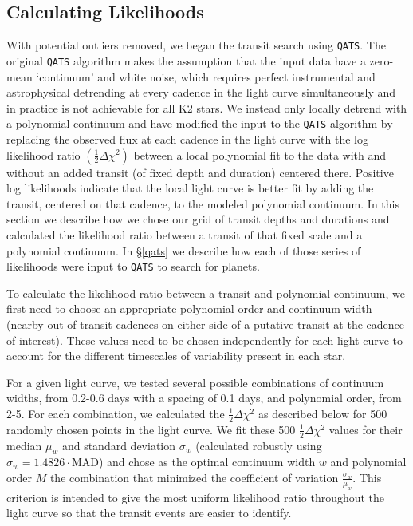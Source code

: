 \documentclass[twocolumn]{aastex62}
\newcommand{\pipeline}[1]{\texttt{#1}}
\begin{document}
\subsection{Calculating Likelihoods}
\label{likelis}

With potential outliers removed, we began the transit search using
\pipeline{QATS}.  The original \pipeline{QATS} algorithm makes the
assumption that the input data have a zero-mean `continuum' and white
noise, which requires perfect instrumental and astrophysical
detrending at every cadence in the light curve simultaneously and in
practice is not achievable for all K2 stars.  We instead only locally
detrend with a polynomial continuum and have modified the input to the
\pipeline{QATS} algorithm by replacing the observed flux at each
cadence in the light curve with the log likelihood ratio
$\left(\frac{1}{2}\Delta \chi^2\right)$ between a local polynomial fit
to the data with and without an added transit (of fixed depth and
duration) centered there. Positive log likelihoods indicate that the
local light curve is better fit by adding the transit, centered on
that cadence, to the modeled polynomial continuum. In this section we
describe how we chose our grid of transit depths and durations and
calculated the likelihood ratio between a transit of that fixed scale
and a polynomial continuum. In \S\ref{qats} we describe how each of
those series of likelihoods were input to \pipeline{QATS} to search
for planets.

To calculate the likelihood ratio between a transit and polynomial
continuum, we first need to choose an appropriate polynomial order and
continuum width (nearby out-of-transit cadences on either side of a
putative transit at the cadence of interest). These values need to be
chosen independently for each light curve to account for the different
timescales of variability present in each star.

For a given light curve, we tested several possible combinations of
continuum widths, from 0.2-0.6 days with a spacing of 0.1 days, and
polynomial order, from 2-5. For each combination, we calculated the $
\frac{1}{2}\Delta \chi^2$ as described below for 500 randomly chosen
points in the light curve. We fit these 500 $\frac{1}{2}\Delta \chi^2$
values for their median $\mu_w$ and standard deviation $\sigma_w$
(calculated robustly using $\sigma_w = 1.4826 \cdot \text{MAD}$) and
chose as the optimal continuum width $w$ and polynomial order $M$ the
combination that minimized the coefficient of variation
$\frac{\sigma_w}{\mu_w}$.  This criterion is intended to give the most
uniform likelihood ratio throughout the light curve so that the
transit events are easier to identify.
\end{document}
